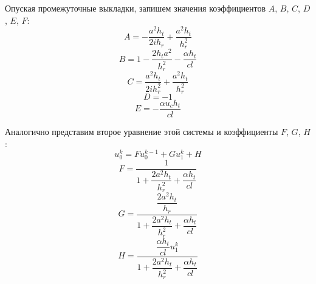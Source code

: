 \documentclass[a4paper,14pt,russian, fleqn]{extreport}
\begin{document}
	Опуская промежуточные выкладки, запишем значения коэффициентов $A$, $B$, $C$, $D$, $E$, $F$:
	\begin{equation*}
		A = -\dfrac{a^2h_t}{2ih_r} + \dfrac{a^2h_t}{h_r^2}
	\end{equation*}
	\begin{equation*}
		B = 1 - \dfrac{2h_ta^2}{h_r^2} - \dfrac{\alpha h_t}{cl}
	\end{equation*}
	\begin{equation*}
		C = \dfrac{a^2h_t}{2ih_r^2} + \dfrac{a^2h_t}{h_r^2}
	\end{equation*}
	\begin{equation*}
		D = -1
	\end{equation*}
	\begin{equation*}
		E = - \dfrac{\alpha u_c h_t}{cl}
	\end{equation*}
	
	Аналогично представим второе уравнение этой системы и коэффициенты $F$, $G$, $H$:
	\begin{equation*}
		u_0^k = Fu_0^{k-1} + Gu_1^k + H
	\end{equation*}
	\begin{equation*}
		F = \dfrac{1}{1 + \dfrac{2a^2h_t}{h_r^2} + \dfrac{\alpha h_t}{cl}}
	\end{equation*}
	\begin{equation*}
		G = \dfrac{\dfrac{2a^2h_t}{h_r}}{1 + \dfrac{2a^2h_t}{h_r^2} + \dfrac{\alpha h_t}{cl}}
	\end{equation*}
	\begin{equation*}
		H = \dfrac{\dfrac{\alpha h_t}{cl}u_1^k}{1 + \dfrac{2a^2h_t}{h_r^2} + \dfrac{\alpha h_t}{cl}}
	\end{equation*}
	\newpage
\end{document}
